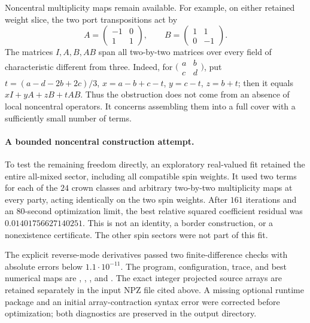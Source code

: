 Noncentral multiplicity maps remain available.  For example,
on either retained weight slice, the two port transpositions
act by
\[
 A=\begin{pmatrix}-1&0\\1&1\end{pmatrix},\qquad
 B=\begin{pmatrix}1&1\\0&-1\end{pmatrix}.
\]
The matrices $I,A,B,AB$ span all two-by-two matrices over
every field of characteristic different from three.
Indeed, for $\bigl(\begin{smallmatrix}a&b\\c&d\end{smallmatrix}\bigr)$,
put $t=(a-d-2b+2c)/3$, $x=a-b+c-t$, $y=c-t$, $z=b+t$;
then it equals $xI+yA+zB+tAB$.
Thus the obstruction does not come from an absence of
local noncentral operators.  It concerns assembling them
into a full cover with a sufficiently small number of terms.

\paragraph{A bounded noncentral construction attempt.}
To test the remaining freedom directly, an exploratory
real-valued fit retained the entire all-mixed sector,
including all compatible spin weights.  It used two terms
for each of the $24$ crown classes and arbitrary two-by-two
multiplicity maps at every party, acting identically on
the two spin weights.  After $161$ iterations and an
$80$-second optimization limit, the best relative squared
coefficient residual was $0.01401756627140251$.
This is not an identity, a border construction, or a
nonexistence certificate.  The other spin sectors were
not part of this fit.

The explicit reverse-mode derivatives passed two
finite-difference checks with absolute errors below
$1.1\cdot10^{-11}$.  The program, configuration, trace,
and best numerical maps are
,
,
, and
.
The exact integer projected source arrays are retained
separately in the input NPZ file cited above.  A missing
optional runtime package and an initial array-contraction
syntax error were corrected before optimization; both
diagnostics are preserved in the output directory.

